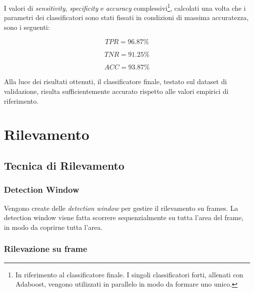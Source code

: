                 I valori di \emph{sensitivity}, \emph{specificity} e \emph{accuracy} complessivi\footnote{In riferimento al classificatore finale. I singoli classificatori forti, allenati con Adaboost, vengono utilizzati in parallelo in modo da formare uno unico.}, calcolati una volta che i parametri dei classificatori sono stati fissati in condizioni di massima accuratezza, sono i seguenti:

                \begin{equation}
                    \label{eq:sensitivity_value}
                    TPR = 96.87\%
                \end{equation}

                \begin{equation}
                    \label{eq:specificity_value}
                    TNR = 91.25\%
                \end{equation}

                \begin{equation}
                    \label{eq:accuracy_value}
                    ACC = 93.87\%
                \end{equation}

                Alla luce dei risultati ottenuti, il classificatore finale, testato sul dataset di validazione, risulta sufficientemente accurato rispetto alle valori empirici di riferimento.


\chapter{Rilevamento}
\label{chap:rilevamento}
    \section{Tecnica di Rilevamento}
    \label{sec:detection_tecnique}
        \subsection{Detection Window}
            Vengono create delle \emph{detection window} per gestire il rilevamento su frames.
            La detection window viene fatta scorrere sequenzialmente su tutta l'area del frame, in modo da coprirne tutta l'area.
        \subsection{Rilevazione su frame}
